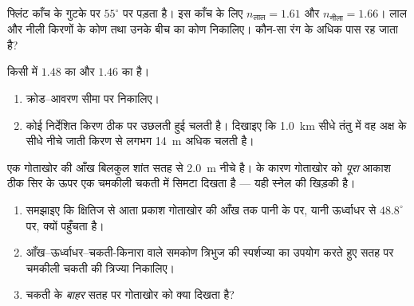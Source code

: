 \begin{exercise}[$\star\star$]\label{exo:g10:refraction:10}
 फ्लिंट काँच के गुटके पर $55^\circ$ पर पड़ता है। इस
काँच के लिए $n_{\text{लाल}} = 1.61$ और $n_{\text{नीला}} = 1.66$। लाल और नीली किरणों के 
कोण तथा उनके बीच का कोण निकालिए। कौन-सा रंग  के अधिक पास
रह जाता है?
\end{exercise}

\begin{exercise}[$\star\star$]\label{exo:g10:refraction:11}
किसी  में $1.48$  का  और
$1.46$  का  है।
\begin{enumerate}
  \item क्रोड--आवरण सीमा पर  निकालिए।
  \item कोई निर्देशित किरण ठीक  पर उछलती हुई चलती
        है। दिखाइए कि \qty{1.0}{km} सीधे तंतु में वह अक्ष के सीधे नीचे जाती
        किरण से लगभग \qty{14}{m} अधिक चलती है।
\end{enumerate}
\end{exercise}

\begin{exercise}[$\star\star\star$]\label{exo:g10:refraction:12}
एक गोताखोर की आँख बिलकुल शांत सतह से \qty{2.0}{m} नीचे है।
 के कारण गोताखोर को \emph{पूरा} आकाश ठीक सिर के ऊपर एक
चमकीली चकती में सिमटा दिखता है --- यही स्नेल की खिड़की है।
\begin{enumerate}
  \item समझाइए कि क्षितिज से आता प्रकाश गोताखोर की आँख तक पानी के
         पर, यानी ऊर्ध्वाधर से $48.8^\circ$ पर, क्यों
        पहुँचता है।
  \item आँख--ऊर्ध्वाधर--चकती-किनारा वाले समकोण त्रिभुज की स्पर्शज्या का
        उपयोग करते हुए सतह पर चमकीली चकती की त्रिज्या निकालिए।
  \item चकती के \emph{बाहर} सतह पर गोताखोर को क्या दिखता है?
\end{enumerate}
\end{exercise}

